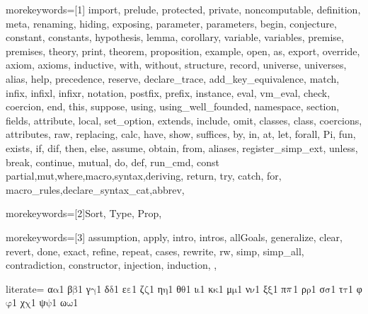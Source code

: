 {%
morekeywords=[1]{
import, prelude, protected, private, noncomputable, definition, meta, renaming,
hiding, exposing, parameter, parameters, begin, conjecture, constant, constants,
hypothesis, lemma, corollary, variable, variables, premise, premises, theory,
print, theorem, proposition, example,
open, as, export, override, axiom, axioms, inductive, with, without,
structure, record, universe, universes,
alias, help, precedence, reserve, declare_trace, add_key_equivalence,
match, infix, infixl, infixr, notation, postfix, prefix, instance,
eval, vm_eval, check, coercion, end, this, suppose,
using, using_well_founded, namespace, section, fields,
attribute, local, set_option, extends, include, omit, classes, class,
coercions, attributes, raw, replacing,
calc, have, show, suffices, by, in, at, let, forall, Pi, fun,
exists, if, dif, then, else, assume, obtain, from, aliases, register_simp_ext, unless, break, continue,
mutual, do, def, run_cmd, const
partial,mut,where,macro,syntax,deriving, return, try, catch, for, macro_rules,declare_syntax_cat,abbrev},

morekeywords=[2]{Sort, Type, Prop},

morekeywords=[3]{
assumption,
apply, intro, intros, allGoals,
generalize, clear, revert, done, exact,
refine, repeat, cases, rewrite, rw,
simp, simp_all, contradiction,
constructor, injection,
induction,
},


literate=
{α}{{\ensuremath{\mathrm{\alpha}}}}1
{β}{{\ensuremath{\mathrm{\beta}}}}1
{γ}{{\ensuremath{\mathrm{\gamma}}}}1
{δ}{{\ensuremath{\mathrm{\delta}}}}1
{ε}{{\ensuremath{\mathrm{\varepsilon}}}}1
{ζ}{{\ensuremath{\mathrm{\zeta}}}}1
{η}{{\ensuremath{\mathrm{\eta}}}}1
{θ}{{\ensuremath{\mathrm{\theta}}}}1
{ι}{{\ensuremath{\mathrm{\iota}}}}1
{κ}{{\ensuremath{\mathrm{\kappa}}}}1
{μ}{{\ensuremath{\mathrm{\mu}}}}1
{ν}{{\ensuremath{\mathrm{\nu}}}}1
{ξ}{{\ensuremath{\mathrm{\xi}}}}1
{π}{{\ensuremath{\mathrm{\mathnormal{\pi}}}}}1
{ρ}{{\ensuremath{\mathrm{\rho}}}}1
{σ}{{\ensuremath{\mathrm{\sigma}}}}1
{τ}{{\ensuremath{\mathrm{\tau}}}}1
{φ}{{\ensuremath{\mathrm{\varphi}}}}1
{χ}{{\ensuremath{\mathrm{\chi}}}}1
{ψ}{{\ensuremath{\mathrm{\psi}}}}1
{ω}{{\ensuremath{\mathrm{\omega}}}}1

}
